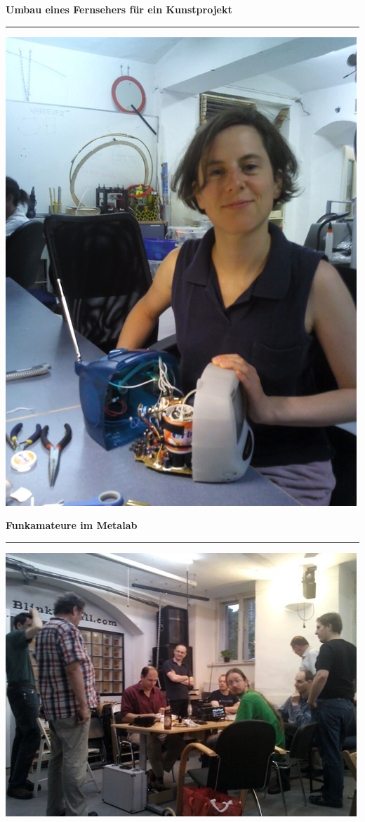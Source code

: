\documentclass{seminar}
\providecommand{\T}[1]{
	\begin{center}
		{\bf #1}
	\end{center}
	\vspace{2mm}
	\hrule
	\vspace{2mm}
}
\begin{document}
\begin{slide}
	\T{Umbau eines Fernsehers für ein Kunstprojekt}
	\begin{center}
		\includegraphics[scale=0.27]{modifying_crt_tv.jpeg}
	\end{center}
\end{slide}

\begin{slide}
	\T{Funkamateure im Metalab}
	\begin{center}
		\includegraphics[scale=0.5]{metafunk.jpeg}
	\end{center}
\end{slide}
\end{document}
